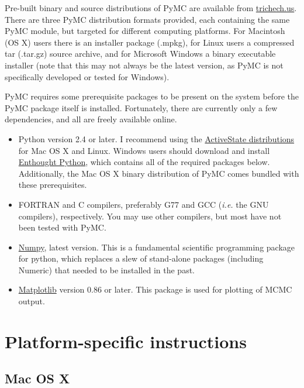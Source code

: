 \documentclass[]{book}
\begin{document}
Pre-built binary and source distributions of PyMC are available from \href{http://trichech.us}{trichech.us}. There are three PyMC distribution formats provided, each containing the same PyMC module, but targeted for different computing platforms. For Macintosh (OS X) users there is an installer package (.mpkg), for Linux users a compressed tar (.tar.gz) source archive, and for Microsoft Windows a binary executable installer (note that this may not always be the latest version, as PyMC is not specifically developed or tested for Windows).

PyMC requires some prerequisite packages to be present on the system before the PyMC package itself is installed. Fortunately, there are currently only a few dependencies, and all are freely available online.
\begin{itemize}

\item Python version 2.4 or later. I recommend using the \href{http://www.activestate.com/Products/ActivePython/}{ActiveState distributions} for Mac OS X and Linux. Windows users should download and install \href{http://code.enthought.com/enthon/}{Enthought Python}, which contains all of the required packages below. Additionally, the Mac OS X binary distribution of PyMC comes bundled with these prerequisites.

\item FORTRAN and C compilers, preferably G77 and GCC (\emph{i.e.} the GNU compilers), respectively. You may use other compilers, but most have not been tested with PyMC.

\item \href{http://numeric.scipy.org/}{Numpy}, latest version. This is a fundamental scientific programming package for python, which replaces a slew of stand-alone packages (including Numeric) that needed to be installed in the past.

\item \href{http://matplotlib.sourceforge.net/}{Matplotlib} version 0.86 or later. This package is used for plotting of MCMC output.
\end{itemize}

 
\section{Platform-specific instructions}
\subsection{Mac OS X}
\end{document}

